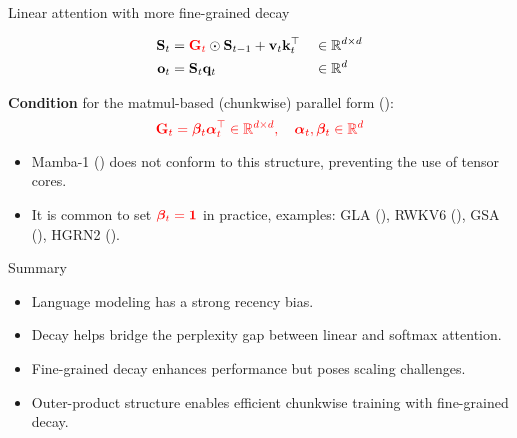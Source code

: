 \begin{frame}{Linear attention with more fine-grained decay}

    \begin{align*}
        \mathbf{S}_t &= {\color{red}\mathbf{G}_t} \odot \mathbf{S}_{t-1} + \mathbf{v}_t\mathbf{k}_t^\top &&\in \mathbb{R}^{d \times d}  \\
        \mathbf{o}_t &= \mathbf{S}_t\mathbf{q}_t &&\in \mathbb{R}^d  
    \end{align*}

    \textbf{Condition} for the matmul-based (chunkwise) parallel form (\cite{gla}):
    \[{\color{red}\mathbf{G}_t = \boldsymbol{\beta}_t\boldsymbol{\alpha}_t^\top \in \mathbb{R}^{d\times d}, \quad \boldsymbol{\alpha}_t, \boldsymbol{\beta}_t \in \mathbb{R}^d}
    \]

    \begin{itemize}
        \item Mamba-1 (\cite{Gu2023MambaLS}) does not conform to this structure, preventing the use of tensor cores.
        \item It is common to set ${\color{red}\boldsymbol{\beta}_t = \mathbf{1}}$ in practice, examples: GLA (\cite{gla}), RWKV6 (\cite{rwkv6}), GSA (\cite{zhang2024gated}), HGRN2 (\cite{hgrn2}).
    \end{itemize}

\end{frame}

\begin{frame}{Summary}
    \begin{itemize}
        \item Language modeling has a strong {\color{red}recency bias}.
        \item Decay helps {\color{red}bridge the perplexity gap} between linear and softmax attention.
        \item {\color{red}Fine-grained decay} enhances performance but poses scaling challenges.
        \item {\color{red}Outer-product structure} enables efficient chunkwise training with fine-grained decay.
    \end{itemize}
\end{frame}
